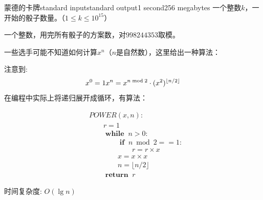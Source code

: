 \begin{problem}{蒙德的卡牌}{standard input}{standard output}{1 second}{256 megabytes}
\InputFile
一个整数$k$，一开始的骰子数量。（$1 \le k \le 10^{15}$）

\OutputFile
一个整数，用完所有骰子的方案数，对$998244353$取模。

\Examples

\begin{example}
%
%
%
\end{example}

\Note
一些选手可能不知道如何计算$x^n$（$n$是自然数），这里给出一种算法：

注意到:
$$
x^0 = 1\\
x^n = x^{n \bmod 2} \cdot (x^2)^{\lfloor n / 2 \rfloor}
$$
在编程中实际上将递归展开成循环，有算法：

$$
\begin{aligned}
& POWER(x, n):\\
& \hspace{2em}   r = 1\\
& \hspace{2em}   \boldsymbol{\operatorname{while }}\; n > 0:\\
& \hspace{4em}       \boldsymbol{\operatorname{if }}\; n \bmod 2 == 1:\\
& \hspace{6em}           r = r \times x\\
& \hspace{4em}       x = x \times x\\
& \hspace{4em}       n = \lfloor n / 2 \rfloor\\
& \hspace{2em}   \boldsymbol{\operatorname{return }}\; r
\end{aligned}
$$

时间复杂度: $O(\lg n)$

\end{problem}

